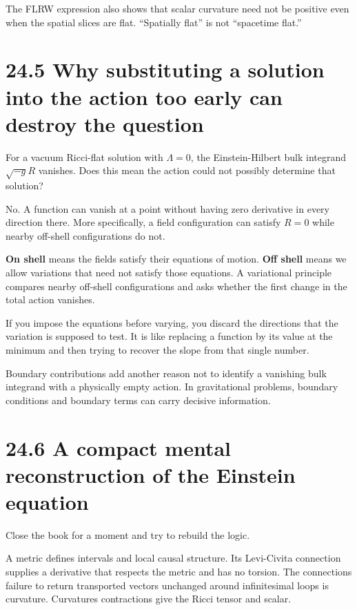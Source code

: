 \documentclass[
  11pt,
  letterpaper,
  oneside,
  openany]{scrbook}
\begin{document}
\endgroup

The FLRW expression also shows that scalar curvature need not be
positive even when the spatial slices are flat. ``Spatially flat'' is
not ``spacetime flat.''

\hypertarget{why-substituting-a-solution-into-the-action-too-early-can-destroy-the-question}{%
\section{24.5 Why substituting a solution into the action too early can
destroy the
question}\label{why-substituting-a-solution-into-the-action-too-early-can-destroy-the-question}}

For a vacuum Ricci-flat solution with \(\Lambda=0\), the
Einstein-Hilbert bulk integrand \(\sqrt{-g}R\) vanishes. Does this mean
the action could not possibly determine that solution?

No. A function can vanish at a point without having zero derivative in
every direction there. More specifically, a field configuration can
satisfy \(R=0\) while nearby off-shell configurations do not.

\textbf{On shell} means the fields satisfy their equations of motion.
\textbf{Off shell} means we allow variations that need not satisfy those
equations. A variational principle compares nearby off-shell
configurations and asks whether the first change in the total action
vanishes.

If you impose the equations before varying, you discard the directions
that the variation is supposed to test. It is like replacing a function
by its value at the minimum and then trying to recover the slope from
that single number.

Boundary contributions add another reason not to identify a vanishing
bulk integrand with a physically empty action. In gravitational
problems, boundary conditions and boundary terms can carry decisive
information.

\hypertarget{a-compact-mental-reconstruction-of-the-einstein-equation}{%
\section{24.6 A compact mental reconstruction of the Einstein
equation}\label{a-compact-mental-reconstruction-of-the-einstein-equation}}

Close the book for a moment and try to rebuild the logic.

A metric defines intervals and local causal structure. Its Levi-Civita
connection supplies a derivative that respects the metric and has no
torsion. The connection\textquotesingle s failure to return transported
vectors unchanged around infinitesimal loops is curvature.
Curvature\textquotesingle s contractions give the Ricci tensor and
scalar.
\end{document}

